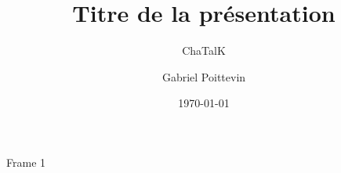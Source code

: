 \documentclass[hyperref={pdfpagemode=FullScreen,
colorlinks=true}]{beamer}
\title[\textbf{Présentation}]{Titre de la présentation}
\subtitle[\ldots]{ChaTalK}
\author[Poittevin]{Gabriel Poittevin}
\institute[ALGGOT\textsuperscript{TM}]{ALGGOT\textsuperscript{TM}}
\date{\today}
\begin{document}
	\maketitle

	\begin{frame}
    Frame 1
	\end{frame}
\end{document}
